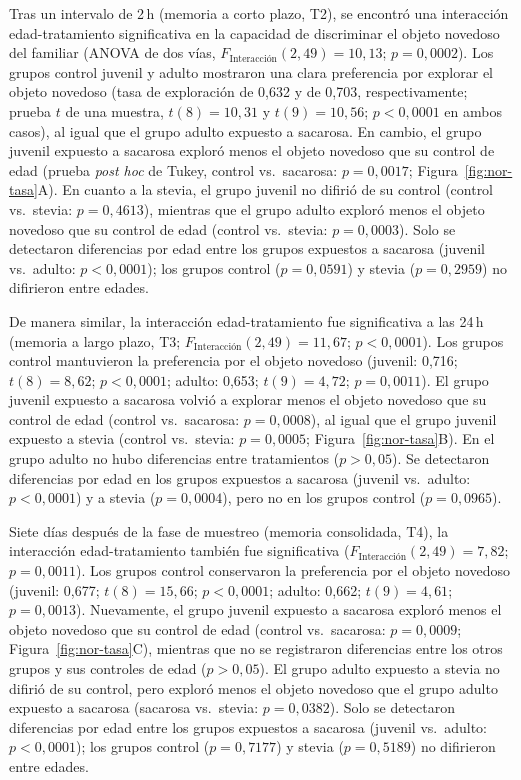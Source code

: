 Tras un intervalo de 2\,h (memoria a corto plazo, T2), se encontró una interacción edad-tratamiento significativa en la capacidad de discriminar el objeto novedoso del familiar (ANOVA de dos vías, $F_{\text{Interacción}}(2, 49) = 10{,}13$; $p = 0{,}0002$). Los grupos control juvenil y adulto mostraron una clara preferencia por explorar el objeto novedoso (tasa de exploración de 0,632 y de 0,703, respectivamente; prueba $t$ de una muestra, $t(8) = 10{,}31$ y $t(9) = 10{,}56$; $p < 0{,}0001$ en ambos casos), al igual que el grupo adulto expuesto a sacarosa. En cambio, el grupo juvenil expuesto a sacarosa exploró menos el objeto novedoso que su control de edad (prueba \textit{post hoc} de Tukey, control vs.\ sacarosa: $p = 0{,}0017$; Figura~\ref{fig:nor-tasa}A). En cuanto a la stevia, el grupo juvenil no difirió de su control (control vs.\ stevia: $p = 0{,}4613$), mientras que el grupo adulto exploró menos el objeto novedoso que su control de edad (control vs.\ stevia: $p = 0{,}0003$). Solo se detectaron diferencias por edad entre los grupos expuestos a sacarosa (juvenil vs.\ adulto: $p < 0{,}0001$); los grupos control ($p = 0{,}0591$) y stevia ($p = 0{,}2959$) no difirieron entre edades.

De manera similar, la interacción edad-tratamiento fue significativa a las 24\,h (memoria a largo plazo, T3; $F_{\text{Interacción}}(2, 49) = 11{,}67$; $p < 0{,}0001$). Los grupos control mantuvieron la preferencia por el objeto novedoso (juvenil: 0,716; $t(8) = 8{,}62$; $p < 0{,}0001$; adulto: 0,653; $t(9) = 4{,}72$; $p = 0{,}0011$). El grupo juvenil expuesto a sacarosa volvió a explorar menos el objeto novedoso que su control de edad (control vs.\ sacarosa: $p = 0{,}0008$), al igual que el grupo juvenil expuesto a stevia (control vs.\ stevia: $p = 0{,}0005$; Figura~\ref{fig:nor-tasa}B). En el grupo adulto no hubo diferencias entre tratamientos ($p > 0{,}05$). Se detectaron diferencias por edad en los grupos expuestos a sacarosa (juvenil vs.\ adulto: $p < 0{,}0001$) y a stevia ($p = 0{,}0004$), pero no en los grupos control ($p = 0{,}0965$).

Siete días después de la fase de muestreo (memoria consolidada, T4), la interacción edad-tratamiento también fue significativa ($F_{\text{Interacción}}(2, 49) = 7{,}82$; $p = 0{,}0011$). Los grupos control conservaron la preferencia por el objeto novedoso (juvenil: 0,677; $t(8) = 15{,}66$; $p < 0{,}0001$; adulto: 0,662; $t(9) = 4{,}61$; $p = 0{,}0013$). Nuevamente, el grupo juvenil expuesto a sacarosa exploró menos el objeto novedoso que su control de edad (control vs.\ sacarosa: $p = 0{,}0009$; Figura~\ref{fig:nor-tasa}C), mientras que no se registraron diferencias entre los otros grupos y sus controles de edad ($p > 0{,}05$). El grupo adulto expuesto a stevia no difirió de su control, pero exploró menos el objeto novedoso que el grupo adulto expuesto a sacarosa (sacarosa vs.\ stevia: $p = 0{,}0382$). Solo se detectaron diferencias por edad entre los grupos expuestos a sacarosa (juvenil vs.\ adulto: $p < 0{,}0001$); los grupos control ($p = 0{,}7177$) y stevia ($p = 0{,}5189$) no difirieron entre edades.

